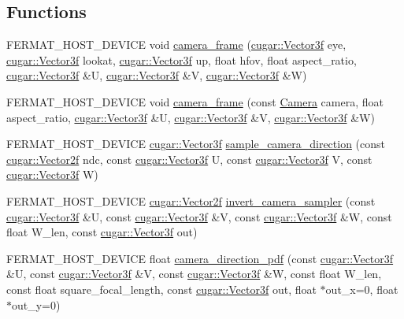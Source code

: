 \subsection*{Functions}
\begin{DoxyCompactItemize}
\item 
F\+E\+R\+M\+A\+T\+\_\+\+H\+O\+S\+T\+\_\+\+D\+E\+V\+I\+CE void \hyperlink{group___camera_module_gaac6a57c4883a499e09399d5f617eccaf}{camera\+\_\+frame} (\hyperlink{structcugar_1_1_vector}{cugar\+::\+Vector3f} eye, \hyperlink{structcugar_1_1_vector}{cugar\+::\+Vector3f} lookat, \hyperlink{structcugar_1_1_vector}{cugar\+::\+Vector3f} up, float hfov, float aspect\+\_\+ratio, \hyperlink{structcugar_1_1_vector}{cugar\+::\+Vector3f} \&U, \hyperlink{structcugar_1_1_vector}{cugar\+::\+Vector3f} \&V, \hyperlink{structcugar_1_1_vector}{cugar\+::\+Vector3f} \&W)
\item 
F\+E\+R\+M\+A\+T\+\_\+\+H\+O\+S\+T\+\_\+\+D\+E\+V\+I\+CE void \hyperlink{group___camera_module_gae03035f4349487f47612fdccf6644826}{camera\+\_\+frame} (const \hyperlink{struct_camera}{Camera} camera, float aspect\+\_\+ratio, \hyperlink{structcugar_1_1_vector}{cugar\+::\+Vector3f} \&U, \hyperlink{structcugar_1_1_vector}{cugar\+::\+Vector3f} \&V, \hyperlink{structcugar_1_1_vector}{cugar\+::\+Vector3f} \&W)
\item 
F\+E\+R\+M\+A\+T\+\_\+\+H\+O\+S\+T\+\_\+\+D\+E\+V\+I\+CE \hyperlink{structcugar_1_1_vector}{cugar\+::\+Vector3f} \hyperlink{group___camera_module_ga74952c76421084e0c5b86cac3c0522c3}{sample\+\_\+camera\+\_\+direction} (const \hyperlink{structcugar_1_1_vector}{cugar\+::\+Vector2f} ndc, const \hyperlink{structcugar_1_1_vector}{cugar\+::\+Vector3f} U, const \hyperlink{structcugar_1_1_vector}{cugar\+::\+Vector3f} V, const \hyperlink{structcugar_1_1_vector}{cugar\+::\+Vector3f} W)
\item 
F\+E\+R\+M\+A\+T\+\_\+\+H\+O\+S\+T\+\_\+\+D\+E\+V\+I\+CE \hyperlink{structcugar_1_1_vector}{cugar\+::\+Vector2f} \hyperlink{group___camera_module_gab65ffc1b980d9f84bd7170e9e3b6941e}{invert\+\_\+camera\+\_\+sampler} (const \hyperlink{structcugar_1_1_vector}{cugar\+::\+Vector3f} \&U, const \hyperlink{structcugar_1_1_vector}{cugar\+::\+Vector3f} \&V, const \hyperlink{structcugar_1_1_vector}{cugar\+::\+Vector3f} \&W, const float W\+\_\+len, const \hyperlink{structcugar_1_1_vector}{cugar\+::\+Vector3f} out)
\item 
F\+E\+R\+M\+A\+T\+\_\+\+H\+O\+S\+T\+\_\+\+D\+E\+V\+I\+CE float \hyperlink{group___camera_module_ga68d204cd13420430192f50fa6b0db5c2}{camera\+\_\+direction\+\_\+pdf} (const \hyperlink{structcugar_1_1_vector}{cugar\+::\+Vector3f} \&U, const \hyperlink{structcugar_1_1_vector}{cugar\+::\+Vector3f} \&V, const \hyperlink{structcugar_1_1_vector}{cugar\+::\+Vector3f} \&W, const float W\+\_\+len, const float square\+\_\+focal\+\_\+length, const \hyperlink{structcugar_1_1_vector}{cugar\+::\+Vector3f} out, float $\ast$out\+\_\+x=0, float $\ast$out\+\_\+y=0)

\end{DoxyCompactItemize}
